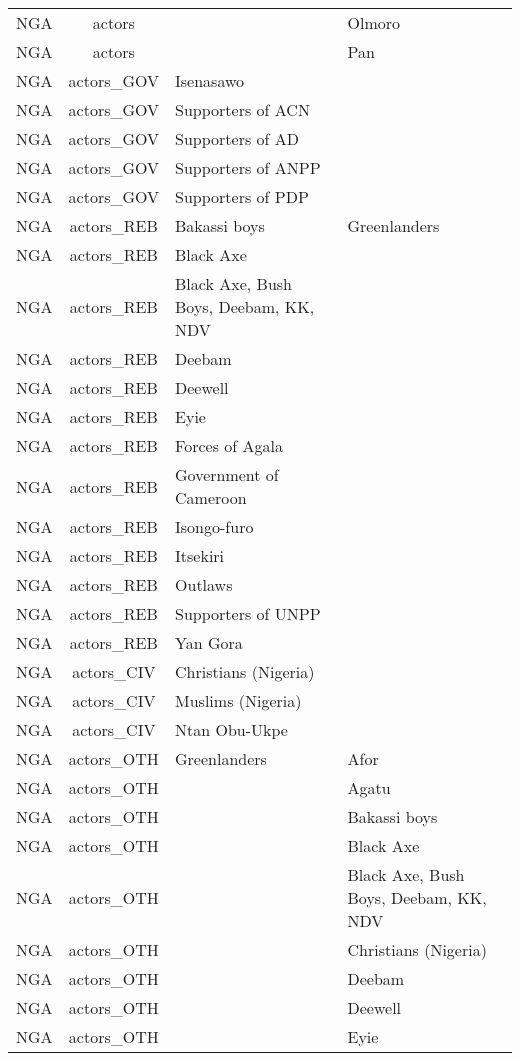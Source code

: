 \documentclass[12pt]{article}
\begin{document}
\begin{center}
\begin{longtable}{|c|c|p{7cm}|p{7cm}|}
  NGA & actors &  & Olmoro \\ 
  NGA & actors &  & Pan \\ 
  NGA & actors\_GOV & Isenasawo &  \\ 
  NGA & actors\_GOV & Supporters of ACN &  \\ 
  NGA & actors\_GOV & Supporters of AD &  \\ 
  NGA & actors\_GOV & Supporters of ANPP &  \\ 
  NGA & actors\_GOV & Supporters of PDP &  \\ 
  NGA & actors\_REB & Bakassi boys & Greenlanders \\ 
  NGA & actors\_REB & Black Axe &  \\ 
  NGA & actors\_REB & Black Axe, Bush Boys, Deebam, KK, NDV &  \\ 
  NGA & actors\_REB & Deebam &  \\ 
  NGA & actors\_REB & Deewell &  \\ 
  NGA & actors\_REB & Eyie &  \\ 
  NGA & actors\_REB & Forces of Agala &  \\ 
  NGA & actors\_REB & Government of Cameroon &  \\ 
  NGA & actors\_REB & Isongo-furo &  \\ 
  NGA & actors\_REB & Itsekiri &  \\ 
  NGA & actors\_REB & Outlaws &  \\ 
  NGA & actors\_REB & Supporters of UNPP &  \\ 
  NGA & actors\_REB & Yan Gora &  \\ 
  NGA & actors\_CIV & Christians (Nigeria) &  \\ 
  NGA & actors\_CIV & Muslims (Nigeria) &  \\ 
  NGA & actors\_CIV & Ntan Obu-Ukpe &  \\ 
  NGA & actors\_OTH & Greenlanders & Afor \\ 
  NGA & actors\_OTH &  & Agatu \\ 
  NGA & actors\_OTH &  & Bakassi boys \\ 
  NGA & actors\_OTH &  & Black Axe \\ 
  NGA & actors\_OTH &  & Black Axe, Bush Boys, Deebam, KK, NDV \\ 
  NGA & actors\_OTH &  & Christians (Nigeria) \\ 
  NGA & actors\_OTH &  & Deebam \\ 
  NGA & actors\_OTH &  & Deewell \\ 
  NGA & actors\_OTH &  & Eyie \\ 

\end{longtable}
\end{center}
\end{document}
